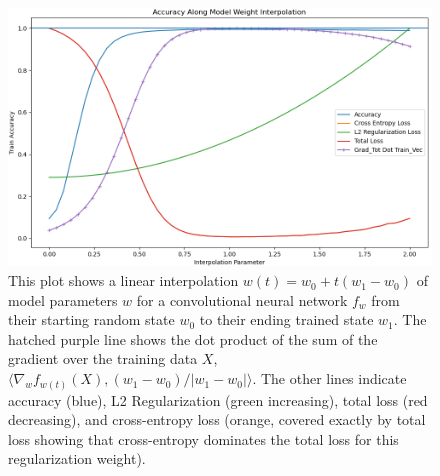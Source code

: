 \begin{figure}[h]
\centering
\includegraphics[width=.85\textwidth]{c4_figures/stab-n-201mnist-C32-100-100-10-0.001-0.0001-eval-mod_int_acc-trn.png}
\caption{This plot shows a linear interpolation $w(t) = w_0 + t(w_{1} - w_0)$ of model parameters $w$ for a convolutional neural network $f_w$ from their starting random state $w_0$ to their ending trained state $w_1$. The hatched purple line shows the dot product of the sum of the  gradient over the training data $X$, $\langle \nabla_w f_{w(t)}(X), (w_1 - w_0)/|w_1 - w_0| \rangle$. The other lines indicate accuracy (blue), L2 Regularization (green increasing), total loss (red decreasing), and cross-entropy loss (orange, covered exactly by total loss showing that cross-entropy dominates the total loss for this regularization weight). }
\label{fig:grad}
\end{figure}


